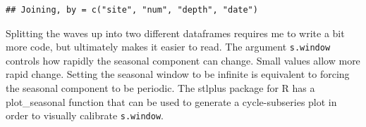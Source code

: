 \documentclass[10pt,A4,]{article}
\newenvironment{Shaded}{\begin{snugshade}}{\end{snugshade}}
\newcommand{\KeywordTok}[1]{\textcolor[rgb]{0.13,0.29,0.53}{\textbf{#1}}}
\newcommand{\DataTypeTok}[1]{\textcolor[rgb]{0.13,0.29,0.53}{#1}}
\newcommand{\DecValTok}[1]{\textcolor[rgb]{0.00,0.00,0.81}{#1}}
\newcommand{\StringTok}[1]{\textcolor[rgb]{0.31,0.60,0.02}{#1}}
\newcommand{\OperatorTok}[1]{\textcolor[rgb]{0.81,0.36,0.00}{\textbf{#1}}}
\newcommand{\NormalTok}[1]{#1}
\begin{document}
\begin{Shaded}
\end{Shaded}

\begin{verbatim}
## Joining, by = c("site", "num", "depth", "date")
\end{verbatim}

\begin{Shaded}
\end{Shaded}

Splitting the waves up into two different dataframes requires me to
write a bit more code, but ultimately makes it easier to read. The
argument \texttt{s.window} controls how rapidly the seasonal component
can change. Small values allow more rapid change. Setting the seasonal
window to be infinite is equivalent to forcing the seasonal component to
be periodic. The stlplus package for R has a plot\_seasonal function
that can be used to generate a cycle-subseries plot in order to visually
calibrate \texttt{s.window}.
\end{document}
